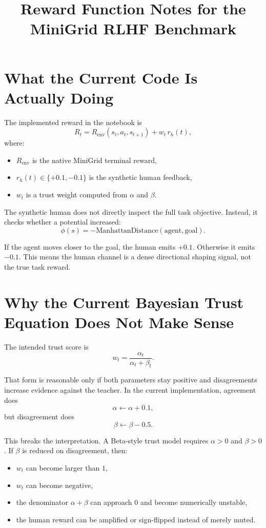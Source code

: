 \documentclass[11pt]{article}
\title{Reward Function Notes for the MiniGrid RLHF Benchmark}
\author{}
\date{}
\begin{document}
\maketitle

\section*{What the Current Code Is Actually Doing}

The implemented reward in the notebook is
\[
R_t = R_{\mathrm{env}}(s_t, a_t, s_{t+1}) + w_t \, r_h(t),
\]
where:
\begin{itemize}
\item $R_{\mathrm{env}}$ is the native MiniGrid terminal reward,
\item $r_h(t) \in \{+0.1, -0.1\}$ is the synthetic human feedback,
\item $w_t$ is a trust weight computed from $\alpha$ and $\beta$.
\end{itemize}

The synthetic human does not directly inspect the full task objective. Instead, it checks whether a potential increased:
\[
\phi(s) = -\mathrm{ManhattanDistance}(\mathrm{agent}, \mathrm{goal}).
\]

If the agent moves closer to the goal, the human emits $+0.1$. Otherwise it emits $-0.1$. This means the human channel is a dense directional shaping signal, not the true task reward.

\section*{Why the Current Bayesian Trust Equation Does Not Make Sense}

The intended trust score is
\[
w_t = \frac{\alpha_t}{\alpha_t + \beta_t}.
\]

That form is reasonable only if both parameters stay positive and disagreements increase evidence against the teacher. In the current implementation, agreement does
\[
\alpha \leftarrow \alpha + 0.1,
\]
but disagreement does
\[
\beta \leftarrow \beta - 0.5.
\]

This breaks the interpretation. A Beta-style trust model requires $\alpha > 0$ and $\beta > 0$. If $\beta$ is reduced on disagreement, then:
\begin{itemize}
\item $w_t$ can become larger than $1$,
\item $w_t$ can become negative,
\item the denominator $\alpha + \beta$ can approach $0$ and become numerically unstable,
\item the human reward can be amplified or sign-flipped instead of merely muted.
\end{itemize}
\end{document}
